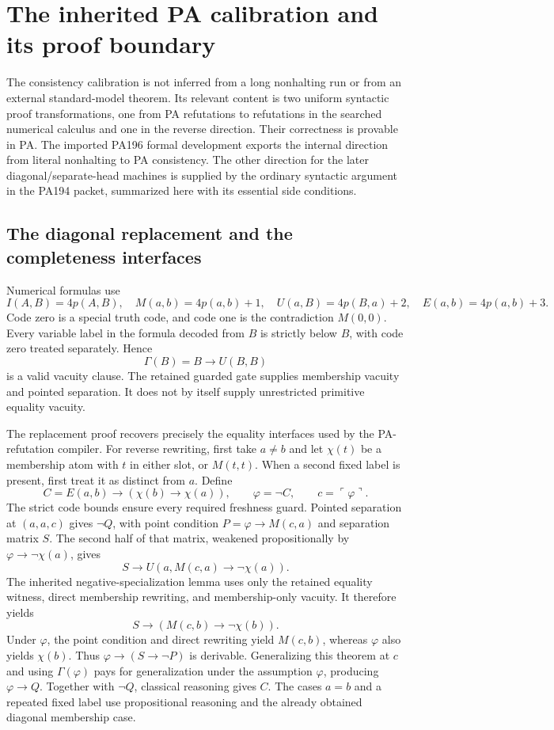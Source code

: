 \section{The inherited PA calibration and its proof boundary}
\label{sec:inherited-calibration-audit}

The consistency calibration is not inferred from a long nonhalting run
or from an external standard-model theorem. Its relevant content is two
uniform syntactic proof transformations, one from PA refutations to
refutations in the searched numerical calculus and one in the reverse
direction. Their correctness is provable in PA. The imported PA196
formal development exports the internal direction from literal
nonhalting to PA consistency. The other direction for the later
diagonal/separate-head machines is supplied by the ordinary syntactic
argument in the PA194 packet, summarized here with its essential side
conditions.

\subsection{The diagonal replacement and the completeness interfaces}

Numerical formulas use
\[
 I(A,B)=4p(A,B),\quad M(a,b)=4p(a,b)+1,\quad
 U(a,B)=4p(B,a)+2,\quad E(a,b)=4p(a,b)+3.
\]
Code zero is a special truth code, and code one is the contradiction
$M(0,0)$. Every variable label in the formula decoded from $B$ is
strictly below $B$, with code zero treated separately. Hence
\[
                       \Gamma(B)=B\to U(B,B)
\]
is a valid vacuity clause. The retained guarded gate supplies membership
vacuity and pointed separation. It does not by itself supply unrestricted
primitive equality vacuity.

The replacement proof recovers precisely the equality interfaces used by
the PA-refutation compiler. For reverse rewriting, first take $a\ne b$
and let $\chi(t)$ be a membership atom with $t$ in either slot, or
$M(t,t)$. When a second fixed label is present, first treat it as distinct
from $a$. Define
\[
 C=E(a,b)\to(\chi(b)\to\chi(a)),\qquad
 \varphi=\neg C,\qquad c=\ulcorner\varphi\urcorner.
\]
The strict code bounds ensure every required freshness guard. Pointed
separation at $(a,a,c)$ gives $\neg Q$, with point condition
$P=\varphi\to M(c,a)$ and separation matrix $S$. The second half of
that matrix, weakened propositionally by
$\varphi\to\neg\chi(a)$, gives
\[
 S\to U(a,M(c,a)\to\neg\chi(a)).
\]
The inherited negative-specialization lemma uses only the retained
equality witness, direct membership rewriting, and membership-only
vacuity. It therefore yields
\[
                   S\to(M(c,b)\to\neg\chi(b)).
\]
Under $\varphi$, the point condition and direct rewriting yield
$M(c,b)$, whereas $\varphi$ also yields $\chi(b)$. Thus
$\varphi\to(S\to\neg P)$ is derivable. Generalizing this theorem at
$c$ and using $\Gamma(\varphi)$ pays for generalization under the
assumption $\varphi$, producing $\varphi\to Q$. Together with
$\neg Q$, classical reasoning gives $C$. The cases $a=b$ and a repeated
fixed label use propositional reasoning and the already obtained
diagonal membership case.

